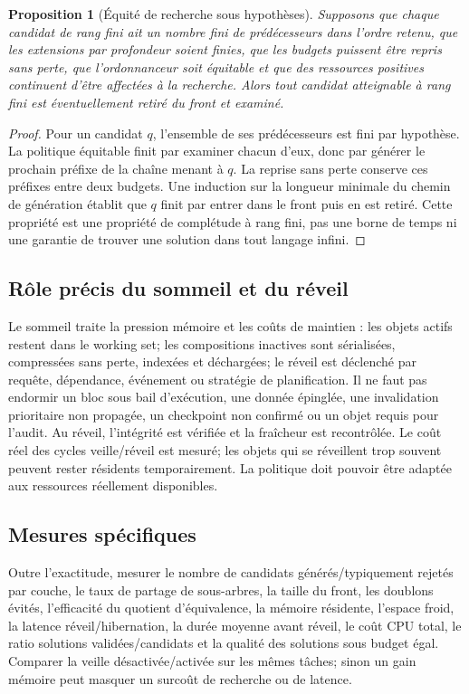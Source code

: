 \documentclass[11pt,a4paper]{article}
\theoremstyle{definition}
\theoremstyle{plain}
\newtheorem{proposition}[definition]{Proposition}
\theoremstyle{remark}
\begin{document}
\begin{proposition}[Équité de recherche sous hypothèses]
Supposons que chaque candidat de rang fini ait un nombre fini de prédécesseurs dans l'ordre retenu, que les extensions par profondeur soient finies, que les budgets puissent être repris sans perte, que l'ordonnanceur soit équitable et que des ressources positives continuent d'être affectées à la recherche. Alors tout candidat atteignable à rang fini est éventuellement retiré du front et examiné.
\end{proposition}
\begin{proof}
Pour un candidat \(q\), l'ensemble de ses prédécesseurs est fini par hypothèse. La politique équitable finit par examiner chacun d'eux, donc par générer le prochain préfixe de la chaîne menant à \(q\). La reprise sans perte conserve ces préfixes entre deux budgets. Une induction sur la longueur minimale du chemin de génération établit que \(q\) finit par entrer dans le front puis en est retiré. Cette propriété est une propriété de complétude à rang fini, pas une borne de temps ni une garantie de trouver une solution dans tout langage infini.
\end{proof}

\subsection{Rôle précis du sommeil et du réveil}
Le sommeil traite la pression mémoire et les coûts de maintien : les objets actifs restent dans le working set; les compositions inactives sont sérialisées, compressées sans perte, indexées et déchargées; le réveil est déclenché par requête, dépendance, événement ou stratégie de planification. Il ne faut pas endormir un bloc sous bail d'exécution, une donnée épinglée, une invalidation prioritaire non propagée, un checkpoint non confirmé ou un objet requis pour l'audit. Au réveil, l'intégrité est vérifiée et la fraîcheur est recontrôlée. Le coût réel des cycles veille/réveil est mesuré; les objets qui se réveillent trop souvent peuvent rester résidents temporairement. La politique doit pouvoir être adaptée aux ressources réellement disponibles.

\subsection{Mesures spécifiques}
Outre l'exactitude, mesurer le nombre de candidats générés/typiquement rejetés par couche, le taux de partage de sous-arbres, la taille du front, les doublons évités, l'efficacité du quotient d'équivalence, la mémoire résidente, l'espace froid, la latence réveil/hibernation, la durée moyenne avant réveil, le coût CPU total, le ratio solutions validées/candidats et la qualité des solutions sous budget égal. Comparer la veille désactivée/activée sur les mêmes tâches; sinon un gain mémoire peut masquer un surcoût de recherche ou de latence.
\end{document}
